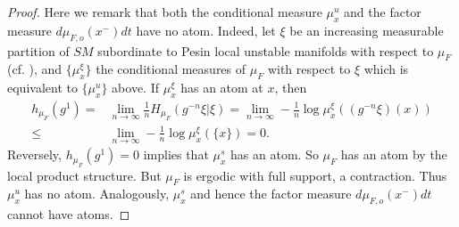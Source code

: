 \documentclass[11pt]{amsart}
\theoremstyle{definition}
\begin{document}
\begin{proof}
Here we remark that both the conditional measure $\mu_x^u$ and the factor measure $d\mu_{F,o} (x^-)dt$ have no atom. Indeed, let $\xi$ be an increasing measurable partition of $SM$ subordinate to Pesin local unstable manifolds with respect to $\mu_F$ (cf. \cite{LY2}),
and $\{\mu_x^\xi\}$ the conditional measures of $\mu_F$ with respect to $\xi$ which is equivalent to $\{\mu_x^u\}$ above. If $\mu_x^\xi$ has an atom at $x$, then
\begin{equation*}
\begin{aligned}
h_{\mu_F}(g^1)=&\lim_{n\to \infty}\frac{1}{n}H_{\mu_F}(g^{-n}\xi|\xi)=\lim_{n\to \infty}-\frac{1}{n}\log \mu_x^\xi((g^{-n}\xi)(x))\\
\le &\lim_{n\to \infty}-\frac{1}{n}\log \mu_x^\xi(\{x\}) =0.
\end{aligned}
\end{equation*}
Reversely, $h_{\mu_F}(g^1)=0$ implies that $\mu_x^s$ has an atom. So $\mu_F$ has an atom by the local product structure. But $\mu_F$ is ergodic with full support, a contraction. 
Thus $\mu_x^u$ has no atom. Analogously, $\mu_x^s$ and hence the factor measure $d\mu_{F,o} (x^-)dt$ cannot have atoms. 



\end{proof}
\end{document}
